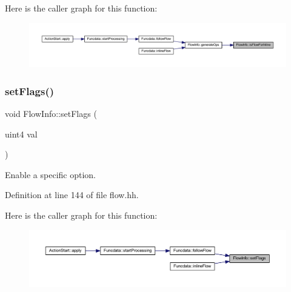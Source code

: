 Here is the caller graph for this function\+:
\nopagebreak
\begin{figure}[H]
\begin{center}
\leavevmode
\includegraphics[width=350pt]{class_flow_info_a93657dc63253335308481daf7ed3c7e3_icgraph}
\end{center}
\end{figure}
\mbox{\label{class_flow_info_a6cc4d42953d1d3106e1cf1938c97f977}} 
\subsubsection{\texorpdfstring{setFlags()}{setFlags()}}
{\footnotesize\ttfamily void Flow\+Info\+::set\+Flags (\begin{DoxyParamCaption}\item[{uint4}]{val }\end{DoxyParamCaption})\hspace{0.3cm}{\ttfamily [inline]}}



Enable a specific option. 



Definition at line 144 of file flow.\+hh.

Here is the caller graph for this function\+:
\nopagebreak
\begin{figure}[H]
\begin{center}
\leavevmode
\includegraphics[width=350pt]{class_flow_info_a6cc4d42953d1d3106e1cf1938c97f977_icgraph}
\end{center}
\end{figure}
\mbox{\label{class_flow_info_a2c8d88b187068f322a2bd8717c0e0ead}} 
